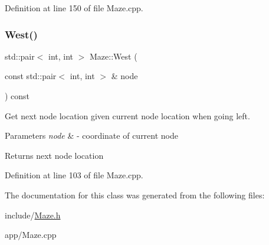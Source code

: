 Definition at line 150 of file Maze.\+cpp.

\mbox{\label{class_maze_a4c45ee7fc87f1c72bb8893106dbb0630}} 
\subsubsection{\texorpdfstring{West()}{West()}}
{\footnotesize\ttfamily std\+::pair$<$ int, int $>$ Maze\+::\+West (\begin{DoxyParamCaption}\item[{const std\+::pair$<$ int, int $>$ \&}]{node }\end{DoxyParamCaption}) const}



Get next node location given current node location when going left. 


\begin{DoxyParams}{Parameters}
{\em node} & -\/ coordinate of current node \\
\hline
\end{DoxyParams}
\begin{DoxyReturn}{Returns}
next node location 
\end{DoxyReturn}


Definition at line 103 of file Maze.\+cpp.



The documentation for this class was generated from the following files\+:\begin{DoxyCompactItemize}
\item 
include/\mbox{\hyperlink{_maze_8h}{Maze.\+h}}\item 
app/Maze.\+cpp\end{DoxyCompactItemize}
